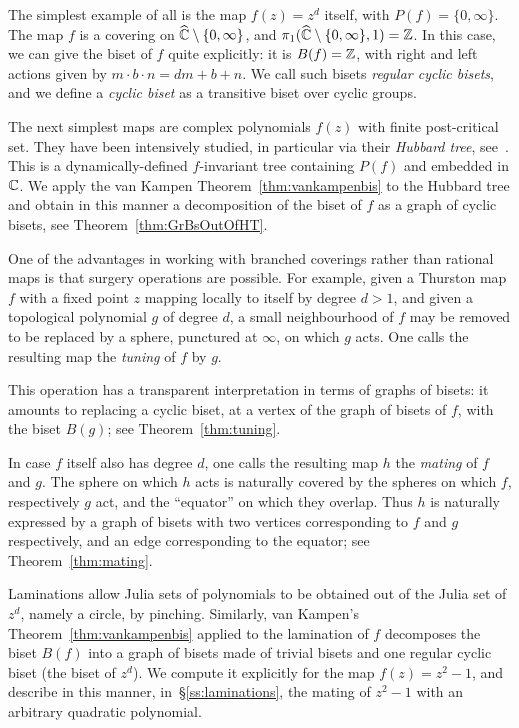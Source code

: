 \documentclass{amsart}
\begin{document}
The simplest example of all is the map $f(z)=z^d$ itself, with
$P(f)=\{0,\infty\}$. The map $f$ is a covering on
${\widehat{{\mathbb C}}}\setminus\{0,\infty\}$, and
$\pi_1({\widehat{{\mathbb C}}}\setminus\{0,\infty\},1)={\mathbb Z}$. In this case, we can give the
biset of $f$ quite explicitly: it is $B(f)={\mathbb Z}$, with right and left
actions given by $m\cdot b\cdot n=d m+b+n$. We call such bisets
\emph{regular cyclic bisets}, and we define a \emph{cyclic biset} as a
transitive biset over cyclic groups.

The next simplest maps are complex polynomials $f(z)$ with finite
post-critical set. They have been intensively studied, in particular
via their \emph{Hubbard tree},
see~\cites{douady-h:edpc1,douady-h:edpc2,poirier:trees}. This is a
dynamically-defined $f$-invariant tree containing $P(f)$ and embedded
in ${\mathbb C}$. We apply the van Kampen Theorem~\ref{thm:vankampenbis} to the
Hubbard tree and obtain in this manner a decomposition of the biset of
$f$ as a graph of cyclic bisets, see Theorem~\ref{thm:GrBsOutOfHT}.

One of the advantages in working with branched coverings rather than
rational maps is that surgery operations are possible. For example,
given a Thurston map $f$ with a fixed point $z$ mapping locally to
itself by degree $d>1$, and given a topological polynomial $g$ of
degree $d$, a small neighbourhood of $f$ may be removed to be replaced
by a sphere, punctured at $\infty$, on which $g$ acts. One calls the
resulting map the \emph{tuning} of $f$ by $g$.

This operation has a transparent interpretation in terms of graphs of
bisets: it amounts to replacing a cyclic biset, at a vertex of the
graph of bisets of $f$, with the biset $B(g)$; see
Theorem~\ref{thm:tuning}.

In case $f$ itself also has degree $d$, one calls the resulting map
$h$ the \emph{mating} of $f$ and $g$.  The sphere on which $h$ acts is
naturally covered by the spheres on which $f$, respectively $g$ act,
and the ``equator'' on which they overlap. Thus $h$ is naturally
expressed by a graph of bisets with two vertices corresponding to $f$
and $g$ respectively, and an edge corresponding to the equator; see
Theorem~\ref{thm:mating}.

Laminations allow Julia sets of polynomials to be obtained out of the
Julia set of $z^d$, namely a circle, by pinching. Similarly, van
Kampen's Theorem~\ref{thm:vankampenbis} applied to the lamination of
$f$ decomposes the biset $B(f)$ into a graph of bisets made of trivial
bisets and one regular cyclic biset (the biset of $z^d$). We compute
it explicitly for the map $f(z)=z^2-1$, and describe in this manner,
in~\S\ref{ss:laminations}, the mating of $z^2-1$ with an arbitrary
quadratic polynomial.
\end{document}
